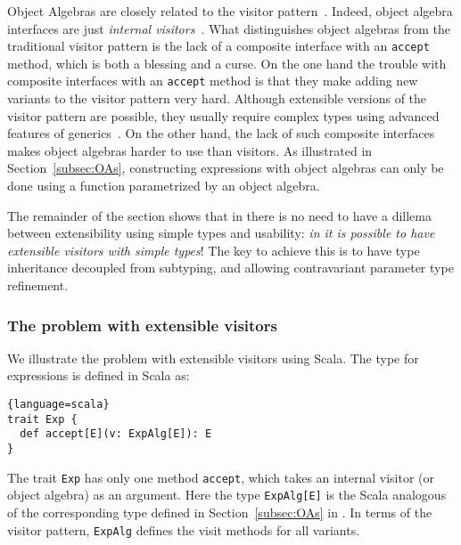 Object Algebras are closely related to the visitor
pattern~\cite{gamma1994design}.  Indeed, object algebra interfaces are just
\emph{internal
  visitors}~\cite{oliveira09modular,oliveira2012extensibility}.
What distinguishes object algebras
from the traditional visitor pattern is the lack of a composite
interface with an \lstinline{accept} method, which
is both a blessing and a curse.  On
the one hand the trouble with composite interfaces with an
\lstinline{accept} method is that they make adding new variants to the
visitor pattern very hard. Although extensible versions of the visitor
pattern are possible, they usually require complex types using
advanced features of generics~\cite{togersen:2004,oliveira2012extensibility}. On the other hand, the lack of
such composite interfaces makes object algebras harder to use than
visitors. As illustrated in Section~\ref{subsec:OAs}, constructing expressions
with object algebras can only be done using a function parametrized by
an object algebra.

The remainder of the section shows that in \name there is no need to
have a dillema between extensibility using simple types and
usability: \emph{in \name it is possible to have extensible visitors with
simple types}! The key to achieve this is to have type inheritance
decoupled from subtyping, and allowing contravariant parameter type
refinement.

\subsubsection{The problem with extensible visitors}
\begin{comment}
is another design pattern that
facilitates extensibility. The gist of this pattern is to decouple an object
hierarchy from the behaviors of each object. In other words, objects no longer
contain operations but instead ``accept'' visitors to perform operations on
them. The visitor pattern tackles at the very problem that makes programming in
traditional OO styles hard to add a new operation, since operations are defined
inside object classes that represent data structures. As a result, using the
visitor pattern allows adding new operations to existing structures without
modifying code of structures, a style enjoyed by functional
programming.
\end{comment}
We illustrate the problem with extensible visitors using Scala.
The type for expressions is defined in Scala as:
\begin{lstlisting}{language=scala}
trait Exp {
  def accept[E](v: ExpAlg[E]): E
}
\end{lstlisting}
The trait \lstinline{Exp} has only one method
\lstinline$accept$, which takes an internal visitor (or object
algebra) as an argument.
Here the type \lstinline{ExpAlg[E]} is the Scala analogous of the
corresponding type defined in Section~\ref{subsec:OAs} in \name. In terms
of the visitor pattern, \lstinline{ExpAlg} defines the visit methods
for all variants.

